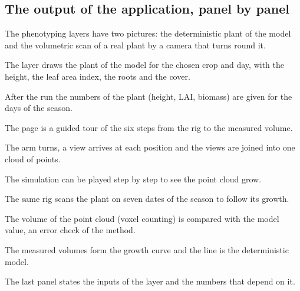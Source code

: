 \subsection{The output of the application, panel by panel}
The phenotyping layers have two pictures: the deterministic plant of the model and the volumetric scan of a real plant by a camera that turns round it.

The layer draws the plant of the model for the chosen crop and day, with the height, the leaf area index, the roots and the cover.


After the run the numbers of the plant (height, LAI, biomass) are given for the days of the season.


The page is a guided tour of the six steps from the rig to the measured volume.


The arm turns, a view arrives at each position and the views are joined into one cloud of points.


The simulation can be played step by step to see the point cloud grow.


The same rig scans the plant on seven dates of the season to follow its growth.


The volume of the point cloud (voxel counting) is compared with the model value, an error check of the method.


The measured volumes form the growth curve and the line is the deterministic model.


The last panel states the inputs of the layer and the numbers that depend on it.


